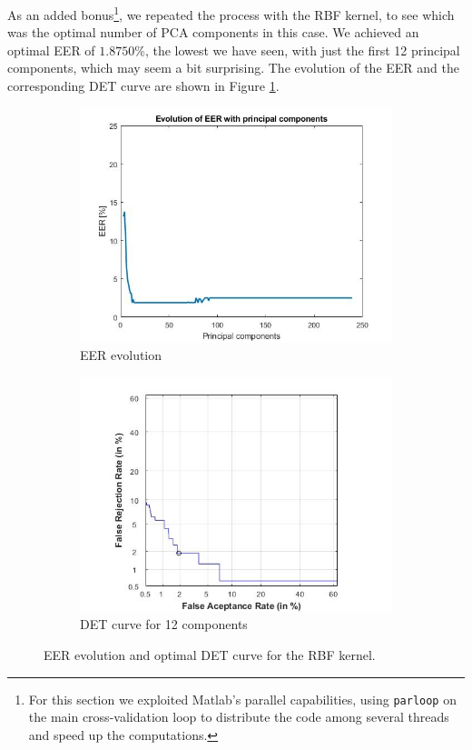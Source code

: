 \documentclass[11pt]{article}
\begin{document}
As an added bonus\footnote{For this section we exploited Matlab's parallel capabilities, using \texttt{parloop} on the main cross-validation loop to distribute the code among several threads and speed up the computations.}, we repeated the process with the RBF kernel, to see which was the optimal number of PCA components in this case. We achieved an optimal EER of $1.8750\%$, the lowest we have seen, with just the first 12 principal components, which may seem a bit surprising. The evolution of the EER and the corresponding DET curve are shown in Figure \ref{fig:ex3b_rbf}.

\begin{figure}[h!]
  \centering
       \begin{subfigure}[t]{0.4\textwidth}
         \centering
         \includegraphics[scale=0.55]{img/3b_rbf_eer}
         \caption{EER evolution}
     \end{subfigure}%
     \quad\quad
     \begin{subfigure}[t]{0.4\textwidth}
         \centering
         \includegraphics[scale=0.55]{img/3b_rbf_det}
         \caption{DET curve for 12 components}
     \end{subfigure}
    \caption{EER evolution and optimal DET curve for the RBF kernel.}
    \label{fig:ex3b_rbf}
\end{figure}
\end{document}
